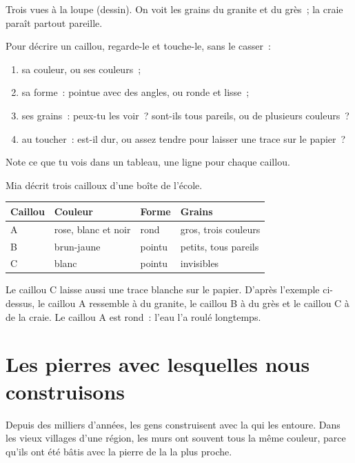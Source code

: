 \begin{omfigure}
{\small Trois  vues à la loupe (dessin). On voit les grains du
granite et du grès~; la craie paraît partout pareille.}
\label{fig:g3:stones-pebbles-sand:magnified}
\end{omfigure}

\begin{method}\label{met:g3:stones-pebbles-sand:look}
Pour décrire un caillou, regarde-le et touche-le, sans le casser~:
\begin{enumerate}
  \item sa couleur, ou ses couleurs~;
  \item sa forme~: pointue avec des angles, ou ronde et lisse~;
  \item ses grains~: peux-tu les voir~? sont-ils tous pareils, ou de
        plusieurs couleurs~?
  \item au toucher~: est-il dur, ou assez tendre pour laisser une trace
        sur le papier~?
\end{enumerate}
Note ce que tu vois dans un tableau, une ligne pour chaque caillou.
\end{method}

\begin{example}\label{ex:g3:stones-pebbles-sand:table}
Mia décrit trois cailloux d'une boîte de l'école.
\begin{center}\small
\begin{tabular}{llll}
\hline
Caillou & Couleur & Forme & Grains \\
\hline
A & rose, blanc et noir & rond & gros, trois couleurs \\
B & brun-jaune & pointu & petits, tous pareils \\
C & blanc & pointu & invisibles \\
\hline
\end{tabular}
\end{center}
Le caillou C laisse aussi une trace blanche sur le papier. D'après
l'exemple ci-dessus, le caillou A ressemble à du granite, le caillou B à du
grès et le caillou C à de la craie. Le caillou A est rond~: l'eau l'a roulé
longtemps.
\end{example}

\section{Les pierres avec lesquelles nous construisons}

Depuis des milliers d'années, les gens construisent avec la  qui les
entoure. Dans les vieux villages d'une région, les murs ont souvent tous
la même couleur, parce qu'ils ont été bâtis avec la pierre de la 
la plus proche.

